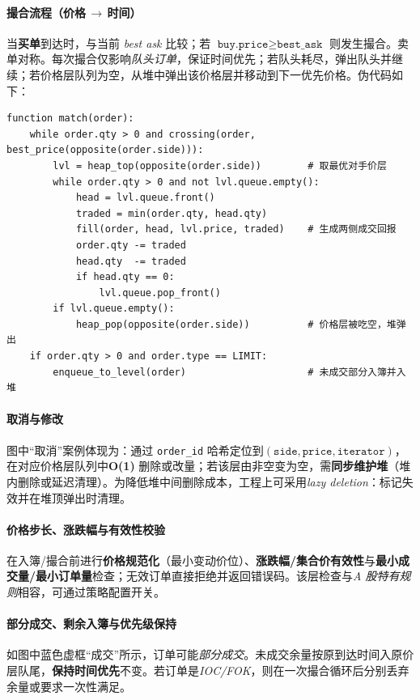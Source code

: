 \documentclass{mancls}
\begin{document}
\paragraph{撮合流程（价格\,$\rightarrow$\,时间）}
当\textbf{买单}到达时，与当前 \emph{best ask} 比较；若 \(\texttt{buy.price} \ge \texttt{best\_ask}\) 则发生撮合。卖单对称。每次撮合仅影响\emph{队头订单}，保证时间优先；若队头耗尽，弹出队头并继续；若价格层队列为空，从堆中弹出该价格层并移动到下一优先价格。伪代码如下：
\begin{verbatim}
function match(order):
    while order.qty > 0 and crossing(order, best_price(opposite(order.side))):
        lvl = heap_top(opposite(order.side))        # 取最优对手价层
        while order.qty > 0 and not lvl.queue.empty():
            head = lvl.queue.front()
            traded = min(order.qty, head.qty)
            fill(order, head, lvl.price, traded)    # 生成两侧成交回报
            order.qty -= traded
            head.qty  -= traded
            if head.qty == 0:
                lvl.queue.pop_front()
        if lvl.queue.empty():
            heap_pop(opposite(order.side))          # 价格层被吃空，堆弹出
    if order.qty > 0 and order.type == LIMIT:
        enqueue_to_level(order)                     # 未成交部分入簿并入堆
\end{verbatim}

\paragraph{取消与修改}
图中“取消”案例体现为：通过 \verb|order_id| 哈希定位到\((\texttt{side}, \texttt{price}, \texttt{iterator})\)，在对应价格层队列中\textbf{O(1)} 删除或改量；若该层由非空变为空，需\textbf{同步维护堆}（堆内删除或延迟清理）。为降低堆中间删除成本，工程上可采用\emph{lazy deletion}：标记失效并在堆顶弹出时清理。

\paragraph{价格步长、涨跌幅与有效性校验}
在入簿/撮合前进行\textbf{价格规范化}（最小变动价位）、\textbf{涨跌幅/集合价有效性}与\textbf{最小成交量/最小订单量}检查；无效订单直接拒绝并返回错误码。该层检查与\emph{A 股特有规则}相容，可通过策略配置开关。

\paragraph{部分成交、剩余入簿与优先级保持}
如图中蓝色虚框“成交”所示，订单可能\emph{部分成交}。未成交余量按原到达时间入原价层队尾，\textbf{保持时间优先}不变。若订单是\emph{IOC/FOK}，则在一次撮合循环后分别丢弃余量或要求一次性满足。
\end{document}
